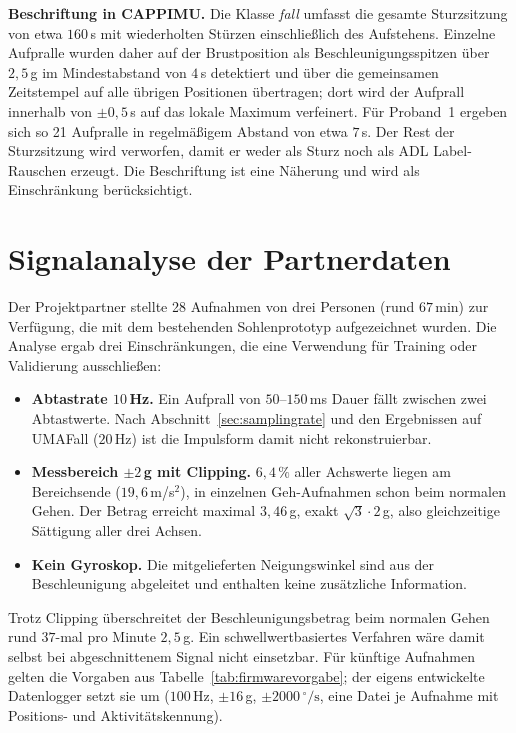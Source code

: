 \documentclass[11pt,a4paper,oneside]{report}
\begin{document}
\textbf{Beschriftung in CAPPIMU.} Die Klasse \emph{fall} umfasst die
gesamte Sturzsitzung von etwa $160$\,s mit wiederholten Stürzen
einschließlich des Aufstehens. Einzelne Aufpralle wurden daher auf der
Brustposition als Beschleunigungsspitzen über $2{,}5$\,g im Mindestabstand
von $4$\,s detektiert und über die gemeinsamen Zeitstempel auf alle
übrigen Positionen übertragen; dort wird der Aufprall innerhalb von
$\pm 0{,}5$\,s auf das lokale Maximum verfeinert. Für Proband~1 ergeben
sich so 21 Aufpralle in regelmäßigem Abstand von etwa $7$\,s. Der Rest
der Sturzsitzung wird verworfen, damit er weder als Sturz noch als
\ac{ADL} Label-Rauschen erzeugt. Die Beschriftung ist eine Näherung
und wird als Einschränkung berücksichtigt.

\section{Signalanalyse der Partnerdaten}
\label{sec:fuss_partner}

Der Projektpartner stellte 28 Aufnahmen von drei Personen
(rund $67$\,min) zur Verfügung, die mit dem bestehenden
Sohlenprototyp aufgezeichnet wurden. Die Analyse ergab drei
Einschränkungen, die eine Verwendung für Training oder Validierung
ausschließen:

\begin{itemize}
\item \textbf{Abtastrate $10$\,Hz.} Ein Aufprall von $50$--$150$\,ms
      Dauer fällt zwischen zwei Abtastwerte. Nach
      Abschnitt~\ref{sec:samplingrate} und den Ergebnissen auf UMAFall
      ($20$\,Hz) ist die Impulsform damit nicht rekonstruierbar.
\item \textbf{Messbereich $\pm 2$\,g mit Clipping.} $6{,}4\,\%$ aller
      Achswerte liegen am Bereichsende ($19{,}6$\,m/s$^2$), in einzelnen
      Geh-Aufnahmen schon beim normalen Gehen. Der Betrag erreicht maximal $3{,}46$\,g,
      exakt $\sqrt{3}\cdot 2$\,g, also gleichzeitige Sättigung aller
      drei Achsen.
\item \textbf{Kein Gyroskop.} Die mitgelieferten Neigungswinkel sind
      aus der Beschleunigung abgeleitet und enthalten keine
      zusätzliche Information.
\end{itemize}

Trotz Clipping überschreitet der Beschleunigungsbetrag beim normalen
Gehen rund $37$-mal pro Minute $2{,}5$\,g. Ein schwellwertbasiertes
Verfahren wäre damit selbst bei abgeschnittenem Signal nicht
einsetzbar. Für künftige Aufnahmen gelten die Vorgaben aus
Tabelle~\ref{tab:firmwarevorgabe}; der eigens entwickelte Datenlogger
setzt sie um ($100$\,Hz, $\pm 16$\,g, $\pm 2000\,^{\circ}/\mathrm{s}$,
eine Datei je Aufnahme mit Positions- und Aktivitätskennung).
\end{document}
